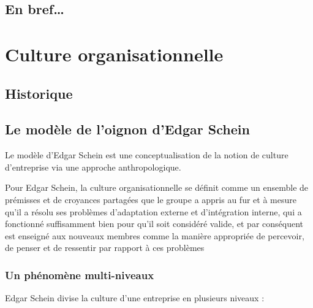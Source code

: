 \documentclass[12pt]{article}
\begin{document}
		
	\subsection{En bref…}
	

\section{Culture organisationnelle}
	\subsection{Historique}
	\subsection{Le modèle de l'oignon d'Edgar Schein}
	
	Le modèle d'Edgar Schein est une conceptualisation de la notion de culture d'entreprise via une approche anthropologique.
	
	Pour Edgar Schein, la culture organisationnelle se définit comme \og{} un ensemble de prémisses et de croyances partagées que le groupe a appris au fur et à mesure qu'il a résolu ses problèmes d'adaptation externe et d'intégration interne, qui a fonctionné suffisamment bien pour qu'il soit considéré valide, et par conséquent est enseigné aux nouveaux membres comme la manière appropriée de percevoir, de penser et de ressentir par rapport à ces problèmes \fg{} \cite{schein2010}
	
	  \subsubsection{Un phénomène multi-niveaux}
	  
	  Edgar Schein divise la culture d'une entreprise en plusieurs niveaux :
	  
\end{document}
